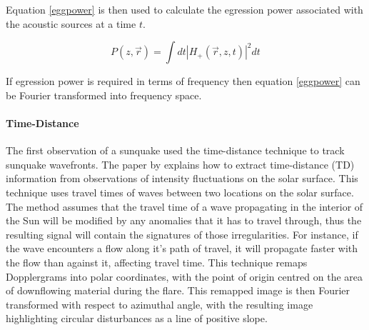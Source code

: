 Equation \ref{eggpower} is then used to calculate the egression power associated with the acoustic sources at a time $t$.

\begin{equation}\label{eggpower}
P(z,\vec{r})=\int dt|H_{+}(\vec{r},z,t)|^{2}dt
\end{equation}

If egression power is required in terms of frequency then equation \ref{eggpower} can be Fourier transformed into frequency space.


\paragraph{Time-Distance}\label{TD}
The first observation of a sunquake \citep{1998Natur.393..317K} used the time-distance technique to track sunquake wavefronts. The paper by \cite{1993Natur.362..430D} explains how to extract time-distance (TD) information from observations of intensity fluctuations on the solar surface. This technique uses travel times of waves between two locations on the solar surface. The method assumes that the travel time of a wave propagating in the interior of the Sun will be modified by any anomalies that it has to travel through, thus the resulting signal will contain the signatures of those irregularities. For instance, if the wave encounters a flow along it's path of travel, it will propagate faster with the flow than against it, affecting travel time.
This technique remaps Dopplergrams into polar coordinates, with the point of origin centred on the area of downflowing material during the flare. This remapped image is then Fourier transformed with respect to azimuthal angle, with the resulting image highlighting circular disturbances as a line of positive slope.
